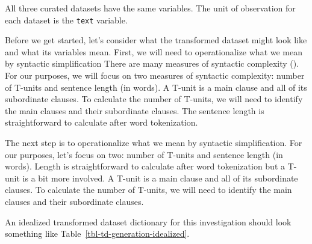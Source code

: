 \documentclass[
  letterpaper,
  DIV=11,
  numbers=noendperiod]{scrreprt}
\theoremstyle{definition}
\theoremstyle{remark}
\begin{document}
All three curated datasets have the same variables. The unit of
observation for each dataset is the \texttt{text} variable.

Before we get started, let's consider what the transformed dataset might
look like and what its variables mean. First, we will need to
operationalize what we mean by syntactic simplification There are many
measures of syntactic complexity
(). For our purposes, we
will focus on two measures of syntactic complexity: number of T-units
and sentence length (in words). A T-unit is a main clause and all of its
subordinate clauses. To calculate the number of T-units, we will need to
identify the main clauses and their subordinate clauses. The sentence
length is straightforward to calculate after word tokenization.

The next step is to operationalize what we mean by syntactic
simplification. For our purposes, let's focus on two: number of T-units
and sentence length (in words). Length is straightforward to calculate
after word tokenization but a T-unit is a bit more involved. A T-unit is
a main clause and all of its subordinate clauses. To calculate the
number of T-units, we will need to identify the main clauses and their
subordinate clauses.

An idealized transformed dataset dictionary for this investigation
should look something like Table~\ref{tbl-td-generation-idealized}.
\end{document}
